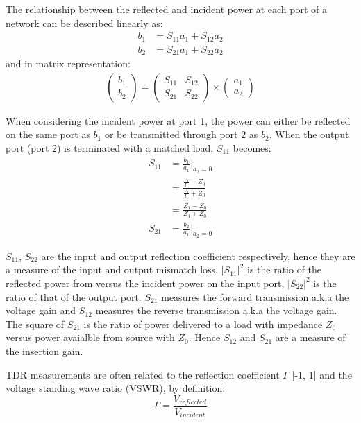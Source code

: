 \documentclass[preprint]{aastex}  %
\begin{document}
The relationship between the reflected and incident power at each port of a network can be described linearly as:
\begin{align}
b_1 &= S_{11}a_1 + S_{12}a_2 \\
b_2 &= S_{21}a_1 + S_{22}a_2
\end{align}
and in matrix representation: 
\begin{align}
\left( \begin{array}{c} b_1 \\ b_2\end{array}\right) = 
\begin{pmatrix} S_{11} & S_{12} \\ S_{21} & S_{22} \end{pmatrix} \times
\left( \begin{array}{c} a_1 \\ a_2\end{array}\right)
\end{align}

When considering the incident power at port 1, the power can either be reflected on the same port as $b_1$ or be transmitted through port 2 as $b_2$. When the output port (port 2) is terminated with a matched load, $S_{11}$ becomes:
\begin{align}
S_{11} &= \frac{b_1}{a_1}|_{a_{2}=0} \nonumber \\
& = \frac{  \frac{V_1}{I_1}-Z_0 }  {\frac{V_1}{I_1}+Z_0   } \nonumber \\
& = \frac{Z_1-Z_0}{Z_1+Z_0} \nonumber \\
S_{21} &= \frac{b_2}{a_1}|_{a_{2}=0} 
\end{align}

$S_{11}$, $S_{22}$ are the input and output reflection coefficient 
respectively, hence they are a measure of the input and output mismatch loss. $
|S_{11}|^2$ is the ratio of the reflected power from versus the
incident power on the input port, $|S_{22}|^2$ is the ratio of that of the 
output port. $S_{21}$ measures the forward transmission a.k.a the voltage gain 
and $S_{12}$ measures the reverse transmission a.k.a the voltage gain. The 
square of $S_{21}$ is the ratio of power delivered to a load with impedance $Z_0
$ versus power avaialble from source with $Z_0$.  Hence $S_{12}$ and $S_{21}$ 
are a measure of the insertion gain.

TDR measurements are often related to the reflection coefficient $\Gamma$ [-1, 1] and the 
voltage standing wave ratio (VSWR), by definition:
\begin{equation}
\Gamma = \frac{V_{reflected}}{V_{incident}} 
\end{equation}
\end{document}
